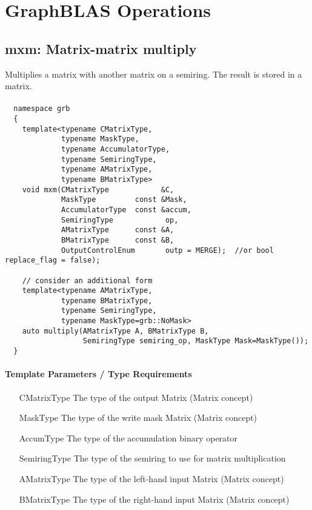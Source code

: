 \section{GraphBLAS Operations}

\subsection{{\sf mxm}: Matrix-matrix multiply}

Multiplies a matrix with another matrix on a semiring. The result is stored in a matrix.

\paragraph{\syntax}

\begin{verbatim}
  namespace grb 
  {
    template<typename CMatrixType,
             typename MaskType,
             typename AccumulatorType,
             typename SemiringType,
             typename AMatrixType,
             typename BMatrixType>
    void mxm(CMatrixType            &C,
             MaskType         const &Mask,
             AccumulatorType  const &accum,
             SemiringType            op,
             AMatrixType      const &A,
             BMatrixType      const &B,
             OutputControlEnum       outp = MERGE);  //or bool replace_flag = false);

    // consider an additional form
    template<typename AMatrixType,
             typename BMatrixType,
             typename SemiringType,
             typename MaskType=grb::NoMask>
    auto multiply(AMatrixType A, BMatrixType B,
                  SemiringType semiring_op, MaskType Mask=MaskType());
  }
\end{verbatim}

\paragraph{Template Parameters / Type Requirements}

\begin{itemize}[leftmargin=1.1in]
    \item[{\sf CMatrixType}]    The type of the output Matrix (Matrix concept)
    \item[{\sf MaskType}]       The type of the write mask Matrix (Matrix concept)
    \item[{\sf AccumType}]      The type of the accumulation binary operator
    \item[{\sf SemiringType}]   The type of the semiring to use for matrix multiplication 
    \item[{\sf AMatrixType}]    The type of the left-hand input Matrix (Matrix concept)
    \item[{\sf BMatrixType}]    The type of the right-hand input Matrix (Matrix concept)
\end{itemize}

